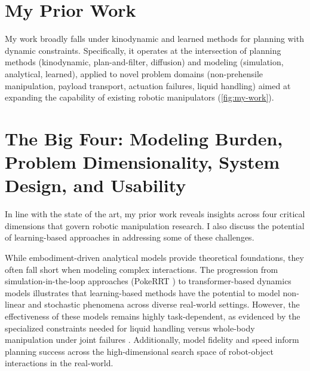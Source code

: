 \section{My Prior Work}

My work broadly falls under kinodynamic and learned methods for planning with dynamic constraints. Specifically, it operates at the intersection of \textcolor{customaqua}{planning methods} (kinodynamic, plan-and-filter, diffusion) and \textcolor{customyellow}{modeling} (simulation, analytical, learned), applied to novel \textcolor{customred}{problem domains} (non-prehensile manipulation, payload transport, actuation failures, liquid handling) aimed at expanding the capability of existing robotic manipulators (\cref{fig:my-work}).





\section{The Big Four: Modeling Burden, Problem Dimensionality, System Design, and Usability}
In line with the state of the art, my prior work reveals insights across four critical dimensions that govern robotic manipulation research. I also discuss the potential of learning-based approaches in addressing some of these challenges.

 While embodiment-driven analytical models provide theoretical foundations, they often fall short when modeling complex interactions. The progression from simulation-in-the-loop approaches (PokeRRT \cite{pasricha2022pokerrt}) to transformer-based dynamics models \cite{reed2024transformer} illustrates that learning-based methods have the potential to model non-linear and stochastic phenomena across diverse real-world settings. However, the effectiveness of these models remains highly task-dependent, as evidenced by the specialized constraints needed for liquid handling \cite{abderezaei2024clutter} versus whole-body manipulation under joint failures \cite{briscoe2024exploring}. Additionally, model fidelity and speed inform planning success across the high-dimensional search space of robot-object interactions in the real-world.

% 

